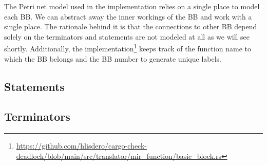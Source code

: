 The Petri net model used in the implementation relies on a single place to model each \acrshort{BB}.
We can abstract away the inner workings of the \acrshort{BB} and work with a single place.
The rationale behind it is that the connections to other \acrshort{BB} depend solely on the terminators
and statements are not modeled at all as we will see shortly.
Additionally, the implementation\footnote{\url{https://github.com/hlisdero/cargo-check-deadlock/blob/main/src/translator/mir_function/basic_block.rs}}
keeps track of the function name to which the \acrshort{BB} belongs and
the \acrshort{BB} number to generate unique labels.

\subsection{Statements}

\subsection{Terminators}
\label{sec:terminators}